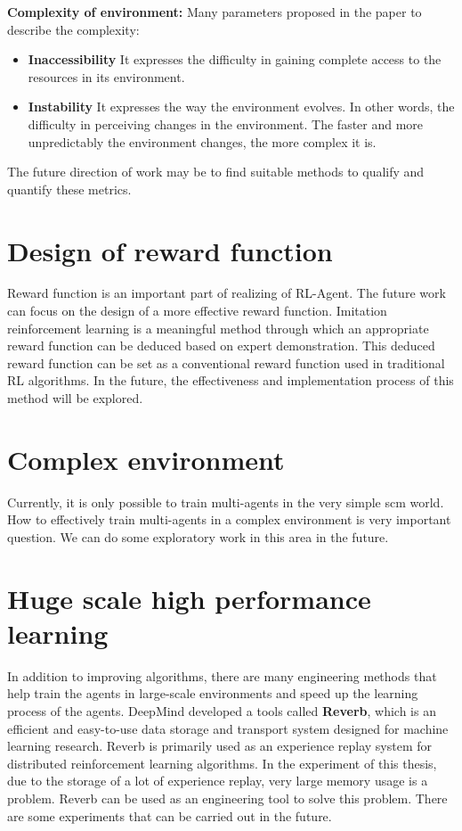 \textbf{Complexity of environment:} Many parameters proposed in the paper  to describe the complexity:
\begin{itemize}
\item \textbf{Inaccessibility} It expresses the difficulty in gaining complete access to the resources in its environment.
\item \textbf{Instability} It expresses the way the environment evolves. In other words, the difficulty in perceiving changes in the environment. The faster and more unpredictably the environment changes, the more complex it is.
\end{itemize}

The future direction of work may be to find suitable methods to qualify and quantify these metrics.

\section{Design of reward function}
Reward function is an important part of realizing of RL-Agent. The future work can focus on the design of a more effective reward function. Imitation reinforcement learning is a meaningful method through which an appropriate reward function can be deduced based on expert demonstration. This deduced reward function can be set as a conventional reward function used in traditional RL algorithms. In the future, the effectiveness and implementation process of this method will be explored.

\section{Complex environment}
Currently, it is only possible to train multi-agents in the very simple \gls{scm} world. How to effectively train multi-agents in a complex environment is very important question. We can do some exploratory work in this area in the future.

\section{Huge scale high performance learning}
In addition to improving algorithms, there are many engineering methods that help train the agents in large-scale environments and speed up the learning process of the agents. DeepMind developed a tools called \textbf{Reverb}\parencite{cassirer2021reverb}, which is an efficient and easy-to-use data storage and transport system designed for machine learning research. Reverb is primarily used as an experience replay system for distributed reinforcement learning algorithms. In the experiment of this thesis, due to the storage of a lot of experience replay, very large memory usage is a problem. Reverb can be used as an engineering tool to solve this problem. There are some experiments that can be carried out in the future.
